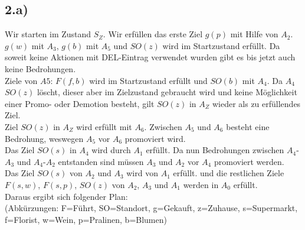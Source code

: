 \documentclass[a4paper]{article}
\begin{document}
\subsection*{2.a)}
Wir starten im Zustand $S_Z$. Wir erfüllen das erste Ziel $g(p)$ mit Hilfe von $A_2$. $g(w)$ mit $A_3$, $g(b)$ mit $A_5$ und $SO(z)$ wird im Startzustand erfüllt. Da soweit keine Aktionen mit DEL-Eintrag verwendet wurden gibt es bis jetzt auch keine Bedrohungen.\\

Ziele von $A5$: $F(f,b)$ wird im Startzustand erfüllt und $SO(b)$ mit $A_4$. Da $A_4$ $SO(z)$ löscht, dieser aber im Zielzustand gebraucht wird und keine Möglichkeit einer Promo- oder Demotion besteht, gilt $SO(z)$ in $A_Z$ wieder als zu erfüllendes Ziel.\\

Ziel $SO(z)$ in $A_Z$ wird erfüllt mit $A_6$. Zwischen $A_5$ und $A_6$ besteht eine Bedrohung, weswegen $A_5$ vor $A_6$ promoviert wird.\\

Das Ziel $SO(s)$ in $A_4$ wird durch $A_1$ erfüllt. Da nun Bedrohungen zwischen $A_4$-$A_3$ und $A_4$-$A_2$ entstanden sind müssen $A_3$ und $A_2$ vor $A_4$ promoviert werden.\\

Das Ziel $SO(s)$ von $A_2$ und $A_3$ wird von $A_1$ erfüllt. und die restlichen Ziele $F(s,w)$, $F(s,p)$, $SO(z)$ von $A_2$, $A_3$ und $A_1$ werden in $A_0$ erfüllt.\\

Daraus ergibt sich folgender Plan:\\

(Abkürzungen: F=Führt, SO=Standort, g=Gekauft, z=Zuhause, s=Supermarkt, f=Florist, w=Wein, p=Pralinen, b=Blumen)\\
\end{document}
